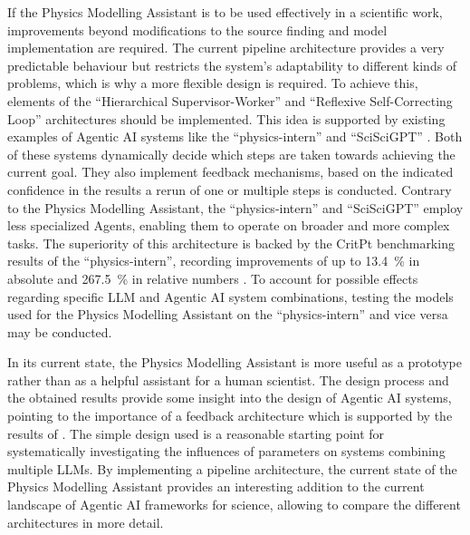 \documentclass[
	fontsize = 11pt,
	paper = a4,
	draft = false,
	twoside = true,
	titlepage = false
]{scrartcl}
\numberwithin{equation}{subsection}
\begin{document}
	If the Physics Modelling Assistant is to be used effectively in a scientific work, improvements beyond modifications to the source finding and model implementation are required. The current pipeline architecture provides a very predictable behaviour but restricts the system's adaptability to different kinds of problems, which is why a more flexible design is required. To achieve this, elements of the \enquote{Hierarchical Supervisor-Worker} \autocite[p.~4-5]{orchStyles} and \enquote{Reflexive Self-Correcting Loop} \autocite[p.~5]{orchStyles} architectures should be implemented. This idea is supported by existing examples of \gls{Agentic AI} systems like the \enquote{physics-intern} \autocite{pIntern} and \enquote{SciSciGPT} \autocite{sciSci}. Both of these systems dynamically decide which steps are taken towards achieving the current goal. They also implement feedback mechanisms, based on the indicated confidence in the results a rerun of one or multiple steps is conducted. Contrary to the Physics Modelling Assistant, the \enquote{physics-intern} \autocite{pIntern} and \enquote{SciSciGPT} \autocite{sciSci} employ less specialized \glspl{Agent}, enabling them to operate on broader and more complex tasks. The superiority of this architecture is backed by the CritPt benchmarking \autocite{critPtArx} results of the \enquote{physics-intern}, recording improvements of up to \SI[round-mode=places, round-precision=1]{13.4}{\percent} in absolute and \SI[round-mode=places, round-precision=1]{267.5}{\percent} in relative numbers \autocite{pIntern}. To account for possible effects regarding specific \gls{LLM} and \gls{Agentic AI} system combinations, testing the models used for the Physics Modelling Assistant on the \enquote{physics-intern} \autocite{pIntern} and vice versa may be conducted.
	
	In its current state, the Physics Modelling Assistant is more useful as a prototype rather than as a helpful assistant for a human scientist. The design process and the obtained results provide some insight into the design of \gls{Agentic AI} systems, pointing to the importance of a feedback architecture which is supported by the results of \citeauthor{orchStyles} \autocite{orchStyles}. The simple design used is a reasonable starting point for systematically investigating the influences of parameters on systems combining multiple \glspl{LLM}. By implementing a pipeline architecture, the current state of the Physics Modelling Assistant provides an interesting addition to the current landscape of \gls{Agentic AI} frameworks for science, allowing to compare the different architectures in more detail.
\end{document}
